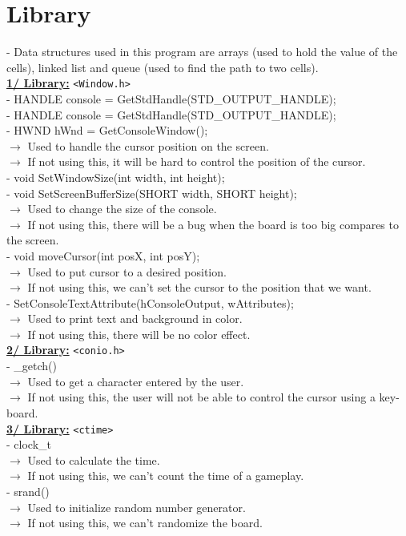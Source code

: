 \documentclass[12pt,a4paper]{report}
\begin{document}
\newpage
\section{Library}
- Data structures used in this program are arrays (used to hold the value of the
cells), linked list and queue (used to find the path to two cells).\\[0.4cm]
\textbf{\underline {1/ Library:}}
\verb|<Window.h>|\\[0.2cm]
- HANDLE console = GetStdHandle(STD\_OUTPUT\_HANDLE);\\
- HANDLE console = GetStdHandle(STD\_OUTPUT\_HANDLE);\\
- HWND hWnd = GetConsoleWindow();\\
$\rightarrow$ Used to handle the cursor position on the screen.\\
$\rightarrow$ If not using this, it will be hard to control the position of the cursor.\\[0.2cm]
- void SetWindowSize(int width, int height);\\
- void SetScreenBufferSize(SHORT width, SHORT height);\\
$\rightarrow$ Used to change the size of the console.\\
$\rightarrow$ If not using this, there will be a bug when the board is too big compares to the
screen.\\[0.2cm]
- void moveCursor(int posX, int posY);\\
$\rightarrow$ Used to put cursor to a desired position.\\
$\rightarrow$ If not using this, we can’t set the cursor to the position that we want.\\[0.2cm]
- SetConsoleTextAttribute(hConsoleOutput, wAttributes);\\
$\rightarrow$ Used to print text and background in color.\\
$\rightarrow$ If not using this, there will be no color effect.\\[0.4cm]
\textbf{\underline {2/ Library:}}
\verb|<conio.h>|\\[0.2cm]
- \_getch()\\
$\rightarrow$ Used to get a character entered by the user.\\
$\rightarrow$ If not using this, the user will not be able to control the cursor using a key-board.\\[0.4cm]
\textbf{\underline {3/ Library:}}
\verb|<ctime>|\\[0.2cm]
- clock\_t\\
$\rightarrow$ Used to calculate the time.\\
$\rightarrow$ If not using this, we can’t count the time of a gameplay.\\[0.2cm]
- srand()\\
$\rightarrow$ Used to initialize random number generator.\\
$\rightarrow$ If not using this, we can’t randomize the board.\\
\end{document}
